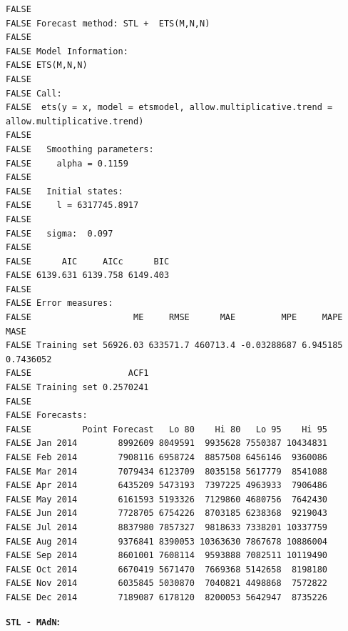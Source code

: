 \documentclass[openany]{book}
\begin{document}
\begin{verbatim}
FALSE 
FALSE Forecast method: STL +  ETS(M,N,N)
FALSE 
FALSE Model Information:
FALSE ETS(M,N,N) 
FALSE 
FALSE Call:
FALSE  ets(y = x, model = etsmodel, allow.multiplicative.trend = allow.multiplicative.trend) 
FALSE 
FALSE   Smoothing parameters:
FALSE     alpha = 0.1159 
FALSE 
FALSE   Initial states:
FALSE     l = 6317745.8917 
FALSE 
FALSE   sigma:  0.097
FALSE 
FALSE      AIC     AICc      BIC 
FALSE 6139.631 6139.758 6149.403 
FALSE 
FALSE Error measures:
FALSE                    ME     RMSE      MAE         MPE     MAPE      MASE
FALSE Training set 56926.03 633571.7 460713.4 -0.03288687 6.945185 0.7436052
FALSE                   ACF1
FALSE Training set 0.2570241
FALSE 
FALSE Forecasts:
FALSE          Point Forecast   Lo 80    Hi 80   Lo 95    Hi 95
FALSE Jan 2014        8992609 8049591  9935628 7550387 10434831
FALSE Feb 2014        7908116 6958724  8857508 6456146  9360086
FALSE Mar 2014        7079434 6123709  8035158 5617779  8541088
FALSE Apr 2014        6435209 5473193  7397225 4963933  7906486
FALSE May 2014        6161593 5193326  7129860 4680756  7642430
FALSE Jun 2014        7728705 6754226  8703185 6238368  9219043
FALSE Jul 2014        8837980 7857327  9818633 7338201 10337759
FALSE Aug 2014        9376841 8390053 10363630 7867678 10886004
FALSE Sep 2014        8601001 7608114  9593888 7082511 10119490
FALSE Oct 2014        6670419 5671470  7669368 5142658  8198180
FALSE Nov 2014        6035845 5030870  7040821 4498868  7572822
FALSE Dec 2014        7189087 6178120  8200053 5642947  8735226
\end{verbatim}

\textbf{\texttt{STL\ -\ MAdN}:}
\end{document}
